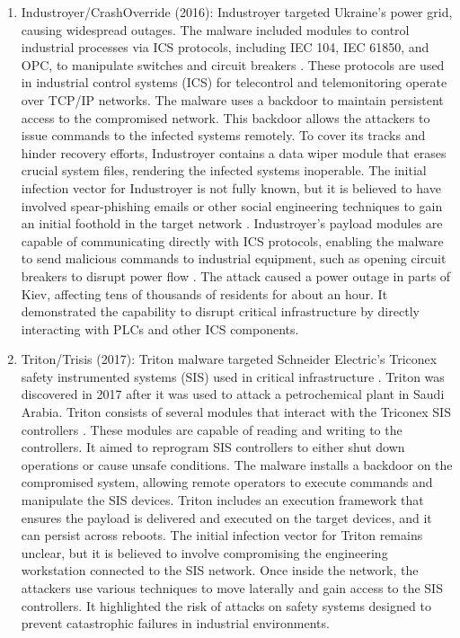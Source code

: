 \begin{enumerate}
    \item Industroyer/CrashOverride (2016): Industroyer \cite{kozak2023industroyer} targeted Ukraine’s power grid, causing widespread outages. The malware included modules to control industrial processes via ICS protocols, including IEC 104, IEC 61850, and OPC, to manipulate switches and circuit breakers \cite{ESET}. These protocols  are used in industrial control systems (ICS) for telecontrol and telemonitoring operate over TCP/IP networks. The malware uses a backdoor to maintain persistent access to the compromised network. This backdoor allows the attackers to issue commands to the infected systems remotely. To cover its tracks and hinder recovery efforts, Industroyer contains a data wiper module that erases crucial system files, rendering the infected systems inoperable. The initial infection vector for Industroyer is not fully known, but it is believed to have involved spear-phishing emails or other social engineering techniques to gain an initial foothold in the target network \cite{dragos}. Industroyer’s payload modules are capable of communicating directly with ICS protocols, enabling the malware to send malicious commands to industrial equipment, such as opening circuit breakers to disrupt power flow \cite{sans}. The attack caused a power outage in parts of Kiev, affecting tens of thousands of residents for about an hour.
    It demonstrated the capability to disrupt critical infrastructure by directly interacting with PLCs and other ICS components.


    
    
    \item Triton/Trisis (2017):  Triton malware targeted Schneider Electric’s Triconex safety instrumented systems (SIS) used in critical infrastructure \cite{mekdad2021threat}. Triton was discovered in 2017 after it was used to attack a petrochemical plant in Saudi Arabia. Triton consists of several modules that interact with the Triconex SIS controllers \cite{trisis_drago}. These modules are capable of reading and writing to the controllers. It aimed to reprogram SIS controllers to either shut down operations or cause unsafe conditions. 
    The malware installs a backdoor on the compromised system, allowing remote operators to execute commands and manipulate the SIS devices. Triton includes an execution framework that ensures the payload is delivered and executed on the target devices, and it can persist across reboots. The initial infection vector for Triton remains unclear, but it is believed to involve compromising the engineering workstation connected to the SIS network. Once inside the network, the attackers use various techniques to move laterally and gain access to the SIS controllers.
    It highlighted the risk of attacks on safety systems designed to prevent catastrophic failures in industrial environments.
    


\end{enumerate}
